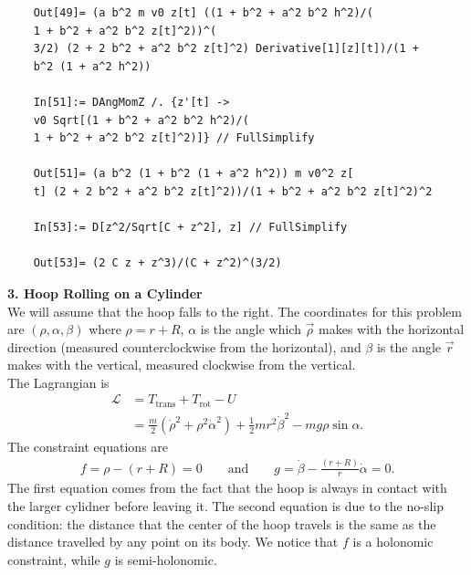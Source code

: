 \documentclass{article}
\theoremstyle{definition}
\newcommand{\lag}{\mathcal{L}}
\newcommand{\al}{\alpha}
\newcommand{\be}{\beta}
\newcommand{\f}[2]{\frac{#1}{#2}}
\newcommand{\lp}{\left(}
\newcommand{\rp}{\right)}
\begin{document}
\begin{enumerate}[label = (\alph*)]
\begin{lstlisting}
	Out[49]= (a b^2 m v0 z[t] ((1 + b^2 + a^2 b^2 h^2)/(
	1 + b^2 + a^2 b^2 z[t]^2))^(
	3/2) (2 + 2 b^2 + a^2 b^2 z[t]^2) Derivative[1][z][t])/(1 + 
	b^2 (1 + a^2 h^2))
	
	In[51]:= DAngMomZ /. {z'[t] -> 
	v0 Sqrt[(1 + b^2 + a^2 b^2 h^2)/(
	1 + b^2 + a^2 b^2 z[t]^2)]} // FullSimplify
	
	Out[51]= (a b^2 (1 + b^2 (1 + a^2 h^2)) m v0^2 z[
	t] (2 + 2 b^2 + a^2 b^2 z[t]^2))/(1 + b^2 + a^2 b^2 z[t]^2)^2
	
	In[53]:= D[z^2/Sqrt[C + z^2], z] // FullSimplify
	
	Out[53]= (2 C z + z^3)/(C + z^2)^(3/2)
	\end{lstlisting}
\end{enumerate} 

 



\noindent \textbf{3. Hoop Rolling on a Cylinder}\\


\noindent We will assume that the hoop falls to the right. The coordinates for this problem are $(\rho,\al,\be)$ where $\rho = r+R$, $\al$ is the angle which $\vec{\rho}$ makes with the horizontal direction (measured counterclockwise from the horizontal), and $\be$ is the angle $\vec{r}$ makes with the vertical, measured clockwise from the vertical.\\

The Lagrangian is 
\begin{align*}
\lag &= T_\text{trans} + T_\text{rot} - U\\
&= \f{m}{2}\lp \dot{\rho}^2 + \rho^2 \dot{\al}^2 \rp + \f{1}{2}mr^2 \dot\beta^2 - mg\rho \sin\al.
\end{align*}
The constraint equations are
\begin{align*}
f = \rho - (r+R) = 0 \quad\quad \text{and} \quad\quad g = \dot\beta - \f{(r+R)}{r}\dot{\al} = 0.
\end{align*}
The first equation comes from the fact that the hoop is always in contact with the larger cylidner before leaving it. The second equation is due to the no-slip condition: the distance that the center of the hoop travels is the same as the distance travelled by any point on its body. We notice that $f$ is a holonomic constraint, while $g$ is semi-holonomic.\\
\end{document}
